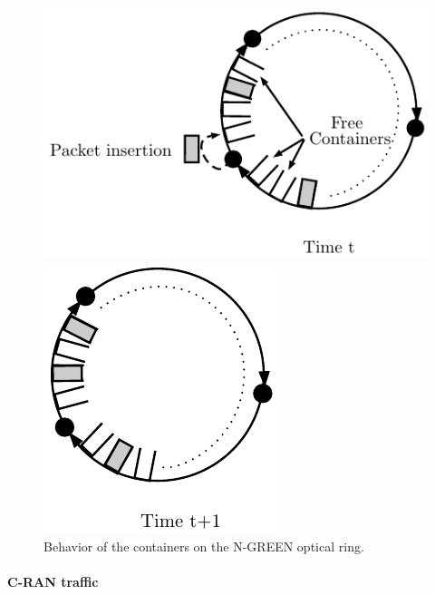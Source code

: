 \documentclass[]{llncs}
\begin{document}
    \begin{figure}[h!]
      \begin{minipage}[b]{0.5\linewidth}
        \begin{center}
      \includegraphics[scale=0.7]{containers}

      \end{center} 
  \end{minipage}
    \begin{minipage}[b]{0.5\linewidth}
        \begin{center}
      \includegraphics[scale=0.7]{containers2}

      \end{center} 
  \end{minipage}

     \caption{Behavior of the containers on the N-GREEN optical ring.}\label{fig:ring}

  \end{figure}

     \paragraph{C-RAN traffic}
   
\end{document}
